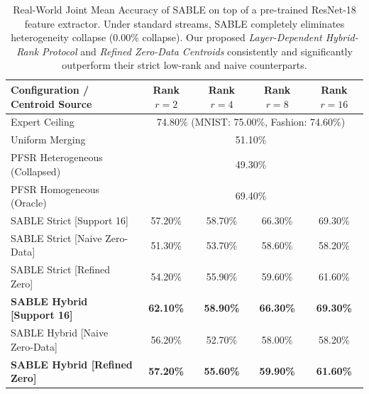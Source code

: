 \begin{table}[htbp]
\caption{Real-World Joint Mean Accuracy of SABLE on top of a pre-trained ResNet-18 feature extractor. Under standard streams, SABLE completely eliminates heterogeneity collapse (0.00\% collapse). Our proposed \emph{Layer-Dependent Hybrid-Rank Protocol} and \emph{Refined Zero-Data Centroids} consistently and significantly outperform their strict low-rank and naive counterparts.}
\label{tab:resnet_results}
\vskip 0.1in
\begin{center}
\begin{small}
\begin{sc}
\begin{tabular}{lcccc}
\toprule
Configuration / Centroid Source & Rank $r=2$ & Rank $r=4$ & Rank $r=8$ & Rank $r=16$ \\
\midrule
Expert Ceiling & \multicolumn{4}{c}{74.80\% (MNIST: 75.00\%, Fashion: 74.60\%)} \\
Uniform Merging & \multicolumn{4}{c}{51.10\%} \\
PFSR Heterogeneous (Collapsed) & \multicolumn{4}{c}{49.30\%} \\
PFSR Homogeneous (Oracle) & \multicolumn{4}{c}{69.40\%} \\
\midrule
SABLE Strict [Support 16] & 57.20\% & 58.70\% & 66.30\% & 69.30\% \\
SABLE Strict [Naive Zero-Data] & 51.30\% & 53.70\% & 58.60\% & 58.20\% \\
SABLE Strict [Refined Zero] & 54.20\% & 55.90\% & 59.60\% & 61.60\% \\
\midrule
\textbf{SABLE Hybrid [Support 16]} & \textbf{62.10\%} & \textbf{58.90\%} & \textbf{66.30\%} & \textbf{69.30\%} \\
SABLE Hybrid [Naive Zero-Data] & 56.20\% & 52.70\% & 58.00\% & 58.20\% \\
\textbf{SABLE Hybrid [Refined Zero]} & \textbf{57.20\%} & \textbf{55.60\%} & \textbf{59.90\%} & \textbf{61.60\%} \\
\bottomrule
\end{tabular}
\end{sc}
\end{small}
\end{center}
\vskip -0.1in
\end{table}

